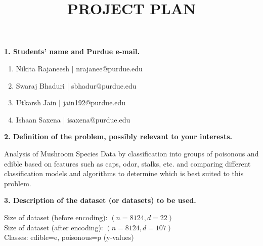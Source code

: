 \documentclass[10pt,letterpaper]{article}
\title{\textbf{PROJECT PLAN}}
\author{\vspace{-0.6in}}
\date{\vspace{-0.6in}}
\newcommand{\somespace}{\vspace{0.075in}}
\begin{document}
\maketitle

\noindent \textbf{1. Students' name and Purdue e-mail.}
\somespace

\begin{enumerate}[label=\alph*.]
    \item Nikita Rajaneesh | nrajanee@purdue.edu
    \item Swaraj Bhaduri | sbhadur@purdue.edu
    \item Utkarsh Jain | jain192@purdue.edu
    \item Ishaan Saxena | isaxena@purdue.edu
\end{enumerate}

\somespace
\noindent \textbf{2. Definition of the problem, possibly relevant to your interests.}
\somespace

Analysis of Mushroom Species Data by classification into groups of poisonous and edible
based on features such as caps, odor, stalks, etc. and comparing different classification
models and algorithms to determine which is best suited to this problem.

\somespace
\noindent \textbf{3. Description of the dataset (or datasets) to be used.}
\somespace

Size of dataset (before encoding): $ (n=8124, d=22) $\\

Size of dataset (after encoding): $ (n=8124, d=107) $\\

Classes: edible=e, poisonous=p (y-values)\\
\end{document}
